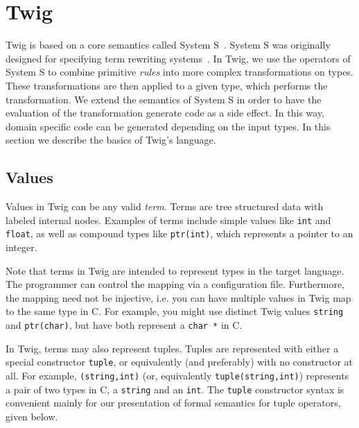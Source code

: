 
\section{Twig}


Twig is based on a core semantics called System S~\cite{Visser:1998p333}.
System S was originally designed for specifying term rewriting
systems~\cite{baader98rewriting}. In Twig, we use the operators of System S to
combine primitive \emph{rules} into more complex transformations on types.
These transformations are then applied to a given type, which performs the
transformation. We extend the semantics of System S in order to have the
evaluation of the transformation generate code as a side effect. In this way,
domain specific code can be generated depending on the input types. In this
section we describe the basics of Twig's language.



\subsection{Values}

Values in Twig can be any valid \emph{term}. Terms are tree structured data
with labeled internal nodes. Examples of terms include simple values like
\texttt{int} and \texttt{float}, as well as compound types like
\texttt{ptr(int)}, which represents a pointer to an integer.

Note that terms in Twig are intended to represent types in the target
language. The programmer can control the mapping via a configuration file.
Furthermore, the mapping need not be injective, i.e. you can have multiple
values in Twig map to the same type in C. For example, you might use distinct
Twig values \texttt{string} and \texttt{ptr(char)}, but have both represent a
\texttt{char *} in C.

In Twig, terms may also represent tuples. Tuples are represented with either a
special constructor \texttt{tuple}, or equivalently (and preferably) with no
constructor at all. For example, \texttt{(string,int)} (or, equivalently
\texttt{tuple(string,int)}) represents a pair of two types in C, a
\texttt{string} and an \texttt{int}. The \texttt{tuple} constructor syntax is
convenient mainly for our presentation of formal semantics for tuple
operators, given below.

